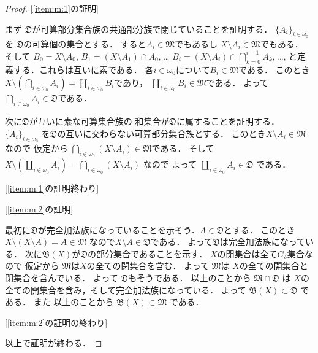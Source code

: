 \documentclass[leqno, 12pt]{jsarticle}
\newcommand{\myomega}{\omega_{0}}
\newcommand{\mybb}[1]{\mathfrak{B}(#1)}
\begin{document}
\begin{proof}

[\ref{item:m:1}の証明]

まず
$\mathfrak{D}$が可算部分集合族の共通部分族で閉じていることを証明する．
$\{A_{i}\}_{i\in \myomega}$を
$\mathfrak{D}$の可算個の集合とする．
すると$A_{i}\in \mathfrak{M}$でもあるし
$X\setminus A_{i}\in \mathfrak{M}$でもある．
そして
$B_{0}=X\setminus A_{0}$, 
$B_{1}=(X\setminus A_{1})\cap A_{0}$, \dots
$B_{i}=(X\setminus A_{i})\cap \bigcap_{k=0}^{i-1}A_{k}$,
\dots,  
と定義する．これらは互いに素である．
各$i\in \myomega$について$B_{i}\in \mathfrak{M}$である．
このとき
$X\setminus \left(\bigcap_{i\in \myomega} A_{i}\right)
=\coprod_{i\in \myomega}B_{i}$であり，
$\coprod_{i\in \myomega}B_{i}\in \mathfrak{M}$である．
よって$\bigcap_{i\in \myomega} A_{i}\in \mathfrak{D}$である．

次に$\mathfrak{D}$が互いに素な可算集合族の
和集合が$\mathfrak{D}$に属することを証明する．
$\{A_{i}\}_{i\in \myomega}$
を$\mathfrak{D}$の互いに交わらない可算部分集合族とする．
このとき$X\setminus A_{i}\in \mathfrak{M}$なので
仮定から
$\bigcap_{i\in \myomega}(X\setminus A_{i})\in 
\mathfrak{M}$である．
そして
$X\setminus \left(\coprod_{i\in \myomega}A_{i}\right)
=\bigcap_{i\in \myomega}(X\setminus A_{i})$
なので
よって
$\coprod_{i\in \myomega}A_{i}\in \mathfrak{D}$
である．


[\ref{item:m:1}の証明終わり]


[\ref{item:m:2}の証明]

最初に$\mathfrak{D}$が完全加法族になっていることを示そう．$A\in \mathfrak{D}$とする．
このとき
$X\setminus (X\setminus A)=A\in \mathfrak{M}$
なので$X\setminus A\in \mathfrak{D}$である．
よって$\mathfrak{D}$は完全加法族になっている．
次に$\mybb{X}$が$\mathfrak{D}$の部分集合であることを示す．
$X$の閉集合は全て$G_{\delta}$集合なので
仮定から
$\mathfrak{M}$は$X$の全ての閉集合を含む．
よって
$\mathfrak{M}$は
$X$の全ての開集合と閉集合を含んでいる．
よって
$\mathfrak{D}$もそうである．
以上のことから
$\mathfrak{M}\cap \mathfrak{D}$
は
$X$の全ての開集合を含み，そして完全加法族になっている．
よって
$\mybb{X}\subset \mathfrak{D}$
である．
また
以上のことから
$\mybb{X}\subset \mathfrak{M}$
である．


[\ref{item:m:2}の証明の終わり]

以上で証明が終わる．
\end{proof}
\end{document}
